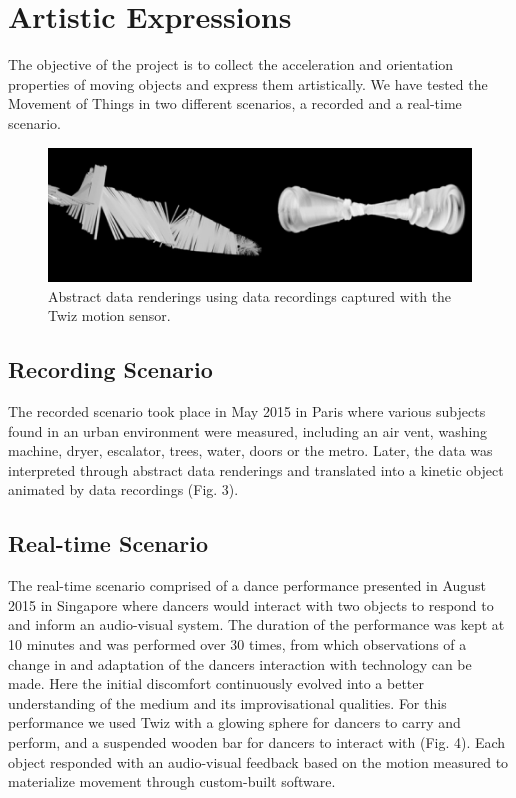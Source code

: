 \documentclass{sigchi}
\begin{document}
\section{Artistic Expressions}

The objective of the project is to collect the acceleration
and orientation properties of moving objects and
express them artistically. We have tested the
Movement of Things in two different scenarios, a
recorded and a real-time scenario.

\begin{figure}[H]
\centering
\includegraphics[width=\columnwidth]{pics/renderings}
\caption{Abstract data renderings using data recordings
captured with the Twiz motion sensor.}
\label{fig:renderings}
\end{figure}

\subsection{Recording Scenario}
The recorded scenario took place in May 2015 in Paris
where various subjects found in an urban environment
were measured, including an air vent, washing
machine, dryer, escalator, trees, water, doors or the
metro. Later, the data was interpreted
through abstract data renderings and translated into a
kinetic object animated by data recordings (Fig. 3).



\subsection{Real-time Scenario}
The real-time scenario comprised of a dance
performance presented in August 2015 in Singapore
where dancers would interact with two objects to
respond to and inform an audio-visual system. The
duration of the performance was kept at 10 minutes
and was performed over 30 times, from which
observations of a change in and adaptation of the
dancers interaction with technology can be made. Here
the initial discomfort continuously evolved into a better
understanding of the medium and its improvisational
qualities. For this performance we used Twiz with a glowing
sphere for dancers to carry and perform, and a
suspended wooden bar for dancers to interact with
(Fig. 4). Each object responded with
an audio-visual feedback based on the motion
measured to materialize movement \cite{hansen} through
custom-built software.
\end{document}
